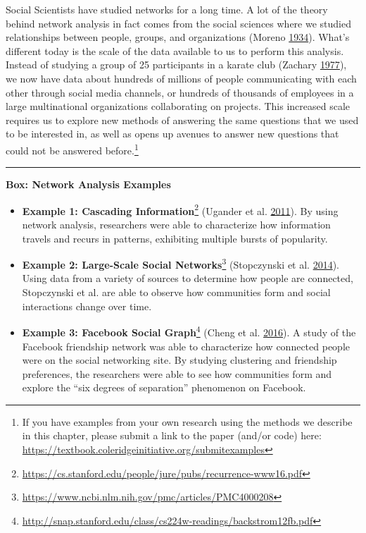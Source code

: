 \documentclass[]{krantz}
\begin{document}
Social Scientists have studied networks for a long time. A lot of the
theory behind network analysis in fact comes from the social sciences
where we studied relationships between people, groups, and organizations
(Moreno \protect\hyperlink{ref-moreno1934}{1934}). What's different
today is the scale of the data available to us to perform this analysis.
Instead of studying a group of 25 participants in a karate club (Zachary
\protect\hyperlink{ref-zachary1977}{1977}), we now have data about
hundreds of millions of people communicating with each other through
social media channels, or hundreds of thousands of employees in a large
multinational organizations collaborating on projects. This increased
scale requires us to explore new methods of answering the same questions
that we used to be interested in, as well as opens up avenues to answer
new questions that could not be answered before.\footnote{If you have
  examples from your own research using the methods we describe in this
  chapter, please submit a link to the paper (and/or code) here:
  \url{https://textbook.coleridgeinitiative.org/submitexamples}}

\begin{center}\rule{0.5\linewidth}{\linethickness}\end{center}

\textbf{Box: Network Analysis Examples}

\begin{itemize}
\item
  \textbf{Example 1: Cascading Information}\footnote{\url{https://cs.stanford.edu/people/jure/pubs/recurrence-www16.pdf}}
  (Ugander et al. \protect\hyperlink{ref-ugander2011}{2011}). By using
  network analysis, researchers were able to characterize how
  information travels and recurs in patterns, exhibiting multiple bursts
  of popularity.
\item
  \textbf{Example 2: Large-Scale Social Networks}\footnote{\url{https://www.ncbi.nlm.nih.gov/pmc/articles/PMC4000208}}
  (Stopczynski et al. \protect\hyperlink{ref-stopczynski2014}{2014}).
  Using data from a variety of sources to determine how people are
  connected, Stopczynski et al. are able to observe how communities form
  and social interactions change over time.
\item
  \textbf{Example 3: Facebook Social Graph}\footnote{\url{http://snap.stanford.edu/class/cs224w-readings/backstrom12fb.pdf}}
  (Cheng et al. \protect\hyperlink{ref-cheng2016}{2016}). A study of the
  Facebook friendship network was able to characterize how connected
  people were on the social networking site. By studying clustering and
  friendship preferences, the researchers were able to see how
  communities form and explore the ``six degrees of separation''
  phenomenon on Facebook.
\end{itemize}
\end{document}
